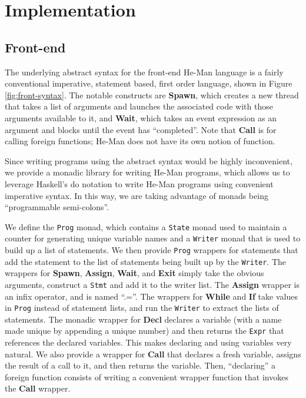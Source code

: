 \documentclass[preprint,11pt]{sigplanconf}
\renewcommand{\t}{\texttt}
\renewcommand{\b}{\textbf}
\begin{document}
\section{Implementation}

\subsection{Front-end}

The underlying abstract syntax for the front-end He-Man language is a
fairly conventional imperative, statement based, first order language,
shown in Figure \ref{fig:front-syntax}. The notable constructs are
\b{Spawn}, which creates a new thread that takes a list of arguments
and launches the associated code with those arguments available to it,
and \b{Wait}, which takes an event expression as an argument and
blocks until the event has ``completed''. Note that \b{Call} is for
calling foreign functions; He-Man does not have its own notion of
function.

Since writing programs using the abstract syntax would be highly
inconvenient, we provide a monadic library for writing He-Man
programs, which allows us to leverage Haskell's do notation to write
He-Man programs using convenient imperative syntax. In this way, we
are taking advantage of monads being ``programmable semi-colons''.

We define the \t{Prog} monad, which contains a \t{State} monad used to
maintain a counter for generating unique variable names and a
\t{Writer} monad that is used to build up a list of statements. We
then provide \t{Prog} wrappers for statements that add the statement
to the list of statements being built up by the \t{Writer}. The
wrappers for \b{Spawn}, \b{Assign}, \b{Wait}, and \b{Exit} simply take
the obvious arguments, construct a \t{Stmt} and add it to the writer
list. The \b{Assign} wrapper is an infix operator, and is named
``.=''. The wrappers for \b{While} and \b{If} take values in \t{Prog}
instead of statement lists, and run the \t{Writer} to extract the
lists of statements. The monadic wrapper for \b{Decl} declares a
variable (with a name made unique by appending a unique number) and
then returns the \t{Expr} that references the declared variables. This
makes declaring and using variables very natural. We also provide a
wrapper for \b{Call} that declares a fresh variable, assigns the
result of a call to it, and then returns the variable. Then,
``declaring'' a foreign function consists of writing a convenient
wrapper function that invokes the \b{Call} wrapper.
\end{document}
